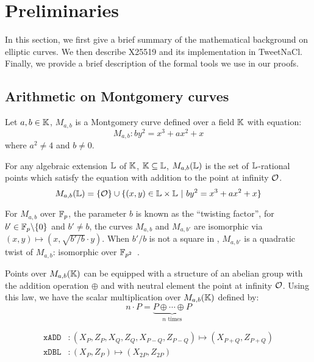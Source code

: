 \section{Preliminaries}
\label{preliminaries}

In this section, we first give a brief summary of the mathematical background
on elliptic curves. We then describe X25519 and its implementation in TweetNaCl.
Finally, we provide a brief description of the formal tools we use in our proofs.

\subsection{Arithmetic on Montgomery curves}
\label{subsec:montgomery}

\begin{definition}
Let $a,b \in \mathbb{K}$, $M_{a,b}$ is a Montgomery curve defined over a field $\mathbb{K}$ with equation:
$$M_{a,b}: by^2 = x^3 + ax^2 + x$$
where $a^2 \neq 4$ and $b \neq 0$.
\end{definition}

\begin{definition}
For any algebraic extension $\mathbb{L}$ of $\mathbb{K}$, $\mathbb{K} \subseteq	\mathbb{L}$,
$M_{a,b}(\mathbb{L})$ is the set of $\mathbb{L}$-rational points which satisfy the equation with
addition to the point at infinity $\mathcal{O}$.
$$M_{a,b}(\mathbb{L}) = \{\mathcal{O}\} \cup \{(x,y) \in \mathbb{L} \times \mathbb{L}~|~by^2 = x^3 + ax^2 + x\}$$
\end{definition}

For $M_{a,b}$ over $\mathbb{F}_{p}$, the parameter $b$ is known as the ``twisting factor'',
for $b'\in \mathbb{F}_{p}\backslash\{0\}$ and $b' \neq b$, the curves $M_{a,b}$ and $M_{a,b'}$
are isomorphic via $(x,y) \mapsto (x, \sqrt{b'/b} \cdot y)$.
When $b'/b$ is not a square in , $M_{a,b'}$ is a quadratic twist of $M_{a,b}$:
isomorphic over $\mathbb{F}_{p^2}$~\cite{cryptoeprint:2017:212}.

Points over $M_{a,b}(\mathbb{K})$ can be equipped with a structure of an abelian group
with the addition operation $\oplus$ and with neutral element the point at infinity $\mathcal{O}$.
Using this law, we have the scalar multiplication over $M_{a,b}(\mathbb{K})$ defined by:
  $$n\cdot P = \underbrace{P \oplus \cdots \oplus P}_{n\text{ times}}$$

\begin{align*}
\texttt{xADD} &: (X_P, Z_P, X_Q , Z_Q, X_{P-Q}, Z_{P-Q}) \mapsto (X_{P+Q}, Z_{P+Q})\\
\texttt{xDBL} &: (X_P, Z_P) \mapsto (X_{2P}, Z_{2P})\\
\end{align*}

